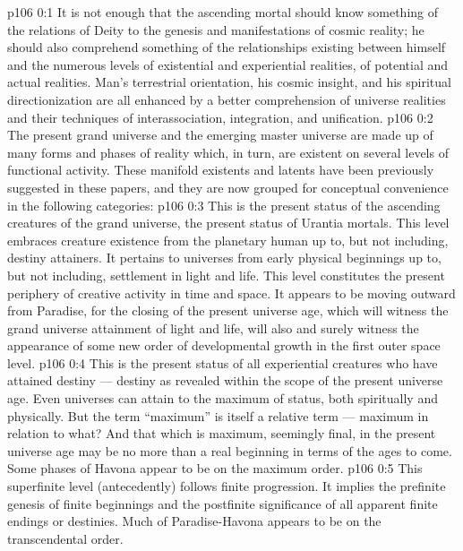 \author{Melchizedek}
\vs p106 0:1 It is not enough that the ascending mortal should know something of the relations of Deity to the genesis and manifestations of cosmic reality; he should also comprehend something of the relationships existing between himself and the numerous levels of existential and experiential realities, of potential and actual realities. Man’s terrestrial orientation, his cosmic insight, and his spiritual directionization are all enhanced by a better comprehension of universe realities and their techniques of interassociation, integration, and unification.
\vs p106 0:2 The present grand universe and the emerging master universe are made up of many forms and phases of reality which, in turn, are existent on several levels of functional activity. These manifold existents and latents have been previously suggested in these papers, and they are now grouped for conceptual convenience in the following categories:
\vs p106 0:3 \bibnobreakspace {} This is the present status of the ascending creatures of the grand universe, the present status of Urantia mortals. This level embraces creature existence from the planetary human up to, but not including, destiny attainers. It pertains to universes from early physical beginnings up to, but not including, settlement in light and life. This level constitutes the present periphery of creative activity in time and space. It appears to be moving outward from Paradise, for the closing of the present universe age, which will witness the grand universe attainment of light and life, will also and surely witness the appearance of some new order of developmental growth in the first outer space level.
\vs p106 0:4 \bibnobreakspace {} This is the present status of all experiential creatures who have attained destiny --- destiny as revealed within the scope of the present universe age. Even universes can attain to the maximum of status, both spiritually and physically. But the term “maximum” is itself a relative term --- maximum in relation to what? And that which is maximum, seemingly final, in the present universe age may be no more than a real beginning in terms of the ages to come. Some phases of Havona appear to be on the maximum order.
\vs p106 0:5 \bibnobreakspace {} This superfinite level (antecedently) follows finite progression. It implies the prefinite genesis of finite beginnings and the postfinite significance of all apparent finite endings or destinies. Much of Paradise\hyp{}Havona appears to be on the transcendental order.
